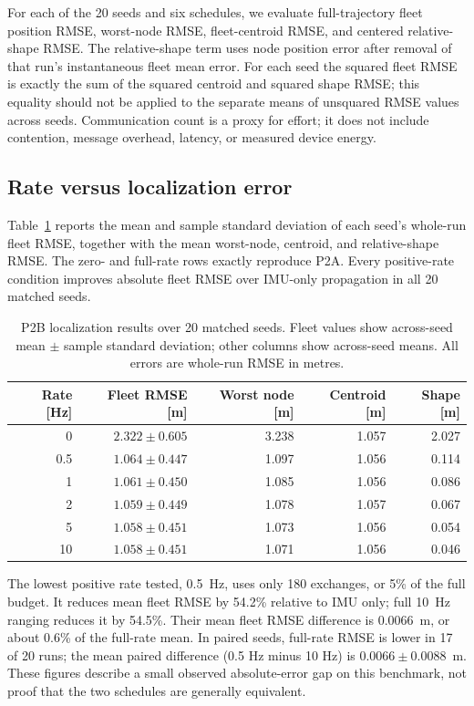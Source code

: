 For each of the 20 seeds and six schedules, we evaluate full-trajectory fleet position RMSE, worst-node RMSE, fleet-centroid RMSE, and centered relative-shape RMSE. The relative-shape term uses node position error after removal of that run's instantaneous fleet mean error. For each seed the squared fleet RMSE is exactly the sum of the squared centroid and squared shape RMSE; this equality should not be applied to the separate means of unsquared RMSE values across seeds. Communication count is a proxy for effort; it does not include contention, message overhead, latency, or measured device energy.

\subsection{Rate versus localization error}
Table~\ref{tab:p2b_results} reports the mean and sample standard deviation of each seed's whole-run fleet RMSE, together with the mean worst-node, centroid, and relative-shape RMSE. The zero- and full-rate rows exactly reproduce P2A. Every positive-rate condition improves absolute fleet RMSE over IMU-only propagation in all 20 matched seeds.

\begin{table}[htbp]
    \centering
    \caption{P2B localization results over 20 matched seeds. Fleet values show across-seed mean \(\pm\) sample standard deviation; other columns show across-seed means. All errors are whole-run RMSE in metres.}
    \label{tab:p2b_results}
    \begin{tabular}{rrrrr}
        \toprule
        Rate [Hz] & Fleet RMSE [m] & Worst node [m] & Centroid [m] & Shape [m] \\
        \midrule
        0 & \(2.322\pm0.605\) & 3.238 & 1.057 & 2.027 \\
        0.5 & \(1.064\pm0.447\) & 1.097 & 1.056 & 0.114 \\
        1 & \(1.061\pm0.450\) & 1.085 & 1.056 & 0.086 \\
        2 & \(1.059\pm0.449\) & 1.078 & 1.057 & 0.067 \\
        5 & \(1.058\pm0.451\) & 1.073 & 1.056 & 0.054 \\
        10 & \(1.058\pm0.451\) & 1.071 & 1.056 & 0.046 \\
        \bottomrule
    \end{tabular}
\end{table}

The lowest positive rate tested, \SI{0.5}{Hz}, uses only 180 exchanges, or 5\% of the full budget. It reduces mean fleet RMSE by 54.2\% relative to IMU only; full \SI{10}{Hz} ranging reduces it by 54.5\%. Their mean fleet RMSE difference is \SI{0.0066}{m}, or about 0.6\% of the full-rate mean. In paired seeds, full-rate RMSE is lower in 17 of 20 runs; the mean paired difference (0.5 Hz minus 10 Hz) is \(0.0066\pm0.0088\)~m. These figures describe a small observed absolute-error gap on this benchmark, not proof that the two schedules are generally equivalent.

